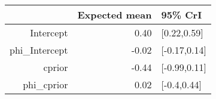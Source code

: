 \begin{tabular}{rrl}
  \hline
 & Expected mean & 95\% CrI \\ 
  \hline
Intercept & 0.40 & [0.22,0.59] \\ 
  phi\_Intercept & -0.02 & [-0.17,0.14] \\ 
  cprior & -0.44 & [-0.99,0.11] \\ 
  phi\_cprior & 0.02 & [-0.4,0.44] \\ 
   \hline
\end{tabular}

